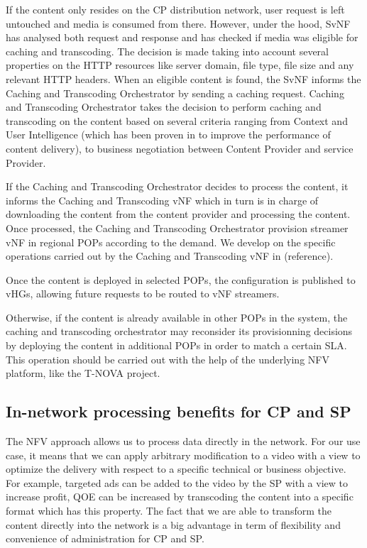 If the content only resides on the CP distribution network, user request is left untouched and media is consumed from there.
However, under the hood, SvNF has analysed both request and response and has checked if media was eligible for caching and transcoding.
The decision is made taking into account several properties on the HTTP resources like server domain, file type, file size and any relevant HTTP headers.
When an eligible content is found, the SvNF informs the Caching and Transcoding Orchestrator by sending a caching request.
Caching and Transcoding Orchestrator takes the decision to perform caching and transcoding on the content based on several criteria ranging from Context and User Intelligence (which has been proven in \cite{wang_cpcdn:_2015} to improve the performance of content delivery), to business negotiation between Content Provider and service Provider.

If the Caching and Transcoding Orchestrator decides to process the content, it informs the Caching and Transcoding vNF which in turn is in charge of downloading the content from the content provider and processing the content.
Once processed, the Caching and Transcoding Orchestrator provision streamer vNF in regional POPs according to the demand.
We develop on the specific operations carried out by the Caching and Transcoding vNF in (reference).

Once the content is deployed in selected POPs, the configuration is published to vHGs, allowing future requests to be routed to vNF streamers.

Otherwise, if the content is already available in other POPs in the system, the caching and transcoding orchestrator may reconsider its provisionning decisions by deploying the content in additional POPs in order to match a certain SLA.
This operation should be carried out with the help of the underlying NFV platform, like the T-NOVA project.

\subsection{In-network processing benefits for CP and SP}
The NFV approach allows us to process data directly in the network.
For our use case, it means that we can apply arbitrary modification to a video with a view to optimize the delivery with respect to a specific technical or business objective.
For example, targeted ads can be added to the video by the SP with a view to increase profit, QOE can be increased by transcoding the content into a specific format which has this property.
The fact that we are able to transform the content directly into the network is a big advantage in term of flexibility and convenience of administration for CP and SP.

